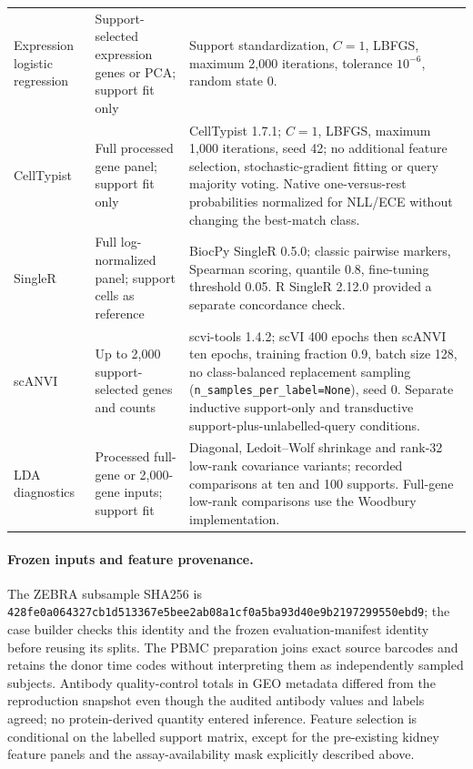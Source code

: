 \begin{longtable}{p{}p{}p{}}
Expression logistic regression & Support-selected expression genes or PCA; support fit only & Support standardization, $C=1$, LBFGS, maximum 2,000 iterations, tolerance $10^{-6}$, random state 0. \\
CellTypist & Full processed gene panel; support fit only & CellTypist 1.7.1; $C=1$, LBFGS, maximum 1,000 iterations, seed 42; no additional feature selection, stochastic-gradient fitting or query majority voting. Native one-versus-rest probabilities normalized for NLL/ECE without changing the best-match class. \\
SingleR & Full log-normalized panel; support cells as reference & BiocPy SingleR 0.5.0; classic pairwise markers, Spearman scoring, quantile 0.8, fine-tuning threshold 0.05. R SingleR 2.12.0 provided a separate concordance check. \\
scANVI & Up to 2,000 support-selected genes and counts & scvi-tools 1.4.2; scVI 400 epochs then scANVI ten epochs, training fraction 0.9, batch size 128, no class-balanced replacement sampling (\texttt{n\_samples\_per\_label=None}), seed 0. Separate inductive support-only and transductive support-plus-unlabelled-query conditions. \\
LDA diagnostics & Processed full-gene or 2,000-gene inputs; support fit & Diagonal, Ledoit--Wolf shrinkage and rank-32 low-rank covariance variants; recorded comparisons at ten and 100 supports. Full-gene low-rank comparisons use the Woodbury implementation. \\
\end{longtable}
\endgroup

\paragraph{Frozen inputs and feature provenance.}
The ZEBRA subsample SHA256 is \texttt{428fe0a0}\allowbreak\texttt{64327cb1}\allowbreak\texttt{d513367e}\allowbreak\texttt{5bee2ab0}\allowbreak\texttt{8a1cf0a5}\allowbreak\texttt{ba93d40e}\allowbreak\texttt{9b219729}\allowbreak\texttt{9550ebd9}; the case builder checks this identity and the frozen evaluation-manifest identity before reusing its splits. The PBMC preparation joins exact source barcodes and retains the donor time codes without interpreting them as independently sampled subjects. Antibody quality-control totals in GEO metadata differed from the reproduction snapshot even though the audited antibody values and labels agreed; no protein-derived quantity entered inference. Feature selection is conditional on the labelled support matrix, except for the pre-existing kidney feature panels and the assay-availability mask explicitly described above.

